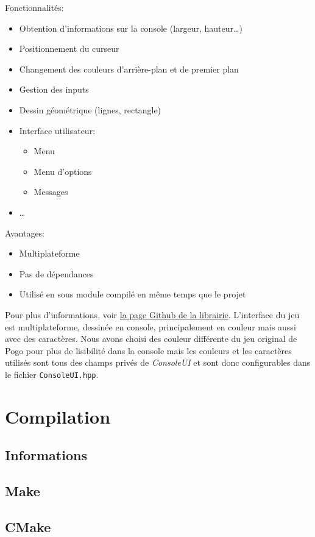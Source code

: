 \documentclass[article, backcover, french, nodocumentinfo]{upmethodology-document}
\begin{document}
					Fonctionnalités:
					\begin{itemize}
						\item Obtention d'informations sur la console (largeur, hauteur\ldots)
						\item Positionnement du curseur
						\item Changement des couleurs d'arrière-plan et de premier plan
						\item Gestion des inputs
						\item Dessin géométrique (lignes, rectangle)
						\item Interface utilisateur:
							\begin{itemize}
								\item Menu
								\item Menu d'options
								\item Messages
							\end{itemize}
						\item \ldots
					\end{itemize}
					Avantages:
					\begin{itemize}
						\item Multiplateforme
						\item Pas de dépendances
						\item Utilisé en sous module compilé en même temps que le projet
					\end{itemize}
					Pour plus d'informations, voir \href{https://github.com/pinam45/ConsoleControl}{la page Github de la librairie}.
					L'interface du jeu est multiplateforme, dessinée en console, principalement en couleur mais aussi avec des caractères. Nous avons choisi des couleur différente du jeu original de Pogo pour plus de lisibilité dans la console mais les couleurs et les caractères utilisés sont tous des champs privés de \textit{ConsoleUI} et sont donc configurables dans le fichier \texttt{ConsoleUI.hpp}.
	\section{Compilation}
		\subsection{Informations}
		\subsection{Make}
		\subsection{CMake}
\end{document}
